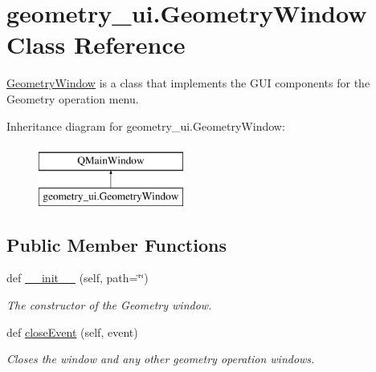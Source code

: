 \hypertarget{classgeometry__ui_1_1_geometry_window}{}\section{geometry\+\_\+ui.\+Geometry\+Window Class Reference}
\label{classgeometry__ui_1_1_geometry_window}


\hyperlink{classgeometry__ui_1_1_geometry_window}{Geometry\+Window} is a class that implements the G\+UI components for the Geometry operation menu.  


Inheritance diagram for geometry\+\_\+ui.\+Geometry\+Window\+:\begin{figure}[H]
\begin{center}
\leavevmode
\includegraphics[height=2.000000cm]{classgeometry__ui_1_1_geometry_window}
\end{center}
\end{figure}
\subsection*{Public Member Functions}
\begin{DoxyCompactItemize}
\item 
def \hyperlink{classgeometry__ui_1_1_geometry_window_af619e3ecabaa9592f6de5987e31a27d3}{\+\_\+\+\_\+init\+\_\+\+\_\+} (self, path=\char`\"{}\char`\"{})
\begin{DoxyCompactList}\small\item\em The constructor of the Geometry window. \end{DoxyCompactList}\item 
\mbox{\label{classgeometry__ui_1_1_geometry_window_a0374b136f1af38239cee73a36f500cbf}} 
def \hyperlink{classgeometry__ui_1_1_geometry_window_a0374b136f1af38239cee73a36f500cbf}{close\+Event} (self, event)
\begin{DoxyCompactList}\small\item\em Closes the window and any other geometry operation windows. \end{DoxyCompactList}\end{DoxyCompactItemize}
